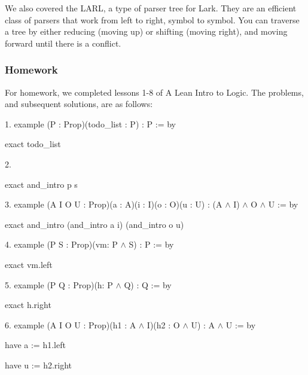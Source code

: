 \documentclass{article}
\theoremstyle{theorem}
\theoremstyle{definition}
\theoremstyle{remark}
\begin{document}
\hspace{0.65cm}We also covered the LARL, a type of parser tree for Lark. They are an efficient class of parsers that work from left to right, symbol to symbol. You can traverse a tree by either reducing (moving up) or shifting 
(moving right), and moving forward until there is a conflict.

\subsubsection{Homework}

For homework, we completed lessons 1-8 of A Lean Intro to Logic. The problems, and subsequent solutions, are as follows:

\begin{list}{}{A Lean Intro to Logic:}
  \item{1.} example (P : Prop)(todo\_list : P) : P := by

  \hspace{6cm}exact todo\_list

  \item {2.} 
  
  \hspace{6cm}exact and\_intro p s
  
  \item {3.} example (A I O U : Prop)(a : A)(i : I)(o : O)(u : U) : (A $\wedge$ I) $\wedge$ O $\wedge$ U := by
  
  \hspace{6cm}exact and\_intro (and\_intro a i) (and\_intro o u)
  
  \item {4.} example (P S : Prop)(vm: P $\wedge$ S) : P := by
  
  \hspace{6cm}exact vm.left 
  
  \item {5.} example (P Q : Prop)(h: P $\wedge$ Q) : Q := by
  
  \hspace{6cm}exact h.right
  
  \item {6.} example (A I O U : Prop)(h1 : A $\wedge$ I)(h2 : O $\wedge$ U) : A $\wedge$ U := by 
  
  \hspace{6cm}have a := h1.left

  \hspace{6cm}have u := h2.right


\end{list}
\end{document}
